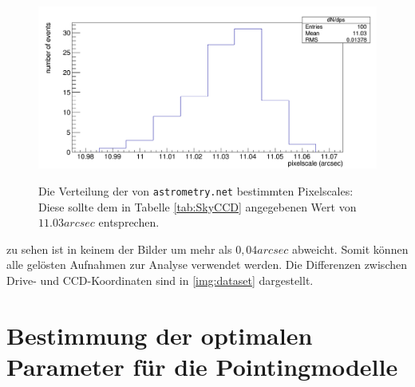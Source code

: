 \begin{figure}[htbp]
\centering
\includegraphics[width=\textwidth]{../341/histo.png}
\label{img:ps}
\caption{Die Verteilung der von \texttt{astrometry.net} bestimmten Pixelscales: Diese sollte dem in Tabelle \ref{tab:SkyCCD} angegebenen Wert von $11.03\unit{arcsec}$ entsprechen.}
\end{figure}
zu sehen ist in keinem der Bilder um mehr als $0,04\unit{arcsec}$ abweicht. Somit können alle gelösten Aufnahmen zur Analyse verwendet werden. Die Differenzen zwischen Drive- und CCD-Koordinaten sind in \ref{img:dataset} dargestellt.
\section{Bestimmung der optimalen Parameter für die Pointingmodelle}

